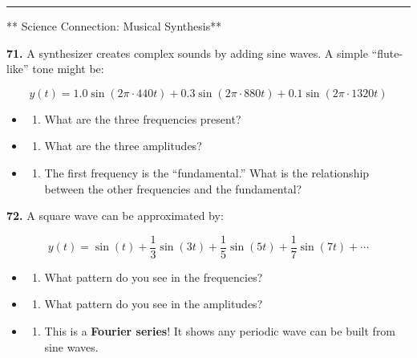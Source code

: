\documentclass[
  11pt,
]{article}
\providecommand{\tightlist}{%
  \setlength{\itemsep}{0pt}\setlength{\parskip}{0pt}}
\begin{document}
\begin{center}\rule{0.5\linewidth}{0.5pt}\end{center}

** Science Connection: Musical Synthesis**

\textbf{71.} A synthesizer creates complex sounds by adding sine waves.
A simple ``flute-like'' tone might be:

\[y(t) = 1.0\sin(2\pi \cdot 440t) + 0.3\sin(2\pi \cdot 880t) + 0.1\sin(2\pi \cdot 1320t)\]

\begin{itemize}
\item
  \begin{enumerate}
  \def\labelenumi{(\alph{enumi})}
  \tightlist
  \item
    What are the three frequencies present?
  \end{enumerate}
\item
  \begin{enumerate}
  \def\labelenumi{(\alph{enumi})}
  \setcounter{enumi}{1}
  \tightlist
  \item
    What are the three amplitudes?
  \end{enumerate}
\item
  \begin{enumerate}
  \def\labelenumi{(\alph{enumi})}
  \setcounter{enumi}{2}
  \tightlist
  \item
    The first frequency is the ``fundamental.'' What is the relationship
    between the other frequencies and the fundamental?
  \end{enumerate}
\end{itemize}

\textbf{72.} A square wave can be approximated by:

\[y(t) = \sin(t) + \frac{1}{3}\sin(3t) + \frac{1}{5}\sin(5t) + \frac{1}{7}\sin(7t) + \cdots\]

\begin{itemize}
\item
  \begin{enumerate}
  \def\labelenumi{(\alph{enumi})}
  \tightlist
  \item
    What pattern do you see in the frequencies?
  \end{enumerate}
\item
  \begin{enumerate}
  \def\labelenumi{(\alph{enumi})}
  \setcounter{enumi}{1}
  \tightlist
  \item
    What pattern do you see in the amplitudes?
  \end{enumerate}
\item
  \begin{enumerate}
  \def\labelenumi{(\alph{enumi})}
  \setcounter{enumi}{2}
  \tightlist
  \item
    This is a \textbf{Fourier series}! It shows any periodic wave can be
    built from sine waves.
  \end{enumerate}
\end{itemize}
\end{document}
